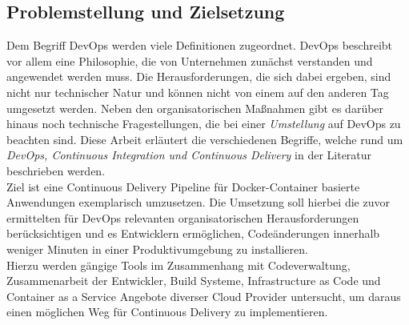 \subsection{Problemstellung und Zielsetzung}\label{problemstellung_ziel}

Dem Begriff DevOps werden viele Definitionen zugeordnet.
DevOps beschreibt vor allem eine Philosophie, die von Unternehmen zunächst verstanden und angewendet werden muss.
Die Herausforderungen, die sich dabei ergeben, sind nicht nur technischer Natur und können nicht von einem auf den anderen Tag umgesetzt werden.
Neben den organisatorischen Maßnahmen gibt es darüber hinaus noch technische Fragestellungen, die bei einer \textsl{Umstellung} auf DevOps zu beachten sind.
Diese Arbeit erläutert die verschiedenen Begriffe, welche rund um \textsl{DevOps, Continuous Integration und Continuous Delivery} in der Literatur beschrieben werden. \\

Ziel ist eine Continuous Delivery Pipeline für Docker-Container basierte Anwendungen exemplarisch umzusetzen.
Die Umsetzung soll hierbei die zuvor ermittelten für DevOps relevanten organisatorischen Herausforderungen berücksichtigen
und es Entwicklern ermöglichen, Codeänderungen innerhalb weniger Minuten in einer Produktivumgebung zu installieren. \\

Hierzu werden gängige Tools im Zusammenhang mit Codeverwaltung, Zusammenarbeit der Entwickler, Build Systeme, Infrastructure as Code und Container
as a Service Angebote diverser Cloud Provider untersucht, um daraus einen möglichen Weg für Continuous Delivery zu implementieren.